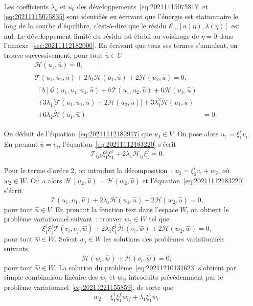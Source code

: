 \documentclass[12pt, final]{amsart}
\begin{document}
Les coefficients \(\lambda_k\) et \(u_k\) des
développements~\eqref{eq:20211115075817} et \eqref{eq:20211115075835} sont
identifiés en écrivant que l'énergie est stationnaire le long de la courbe
d'équilibre, c'est-à-dire que le résidu
\(ℰ_{,u}[u(η), \lambda(η)]\) est nul. Le développement limité du
résidu est établi au voisinage de \(η=0\) dans
l'annexe~\ref{sec:20211112182000}. En écrivant que tous ses termes s'annulent,
on trouve successivement, pour tout \(\hat{u}∈ U\)
\begin{gather}
  \label{eq:20211112182917}
  \mathcal H(u_1, \hat{u})=0,\\
  \label{eq:20211112183220}
  \mathcal T(u_1, u_1, \hat{u})
  +2\lambda_1\dot{\mathcal H}(u_1, \hat{u})
  +2\mathcal H(u_2, \hat{u})=0,\\
  \begin{aligned}[b]
    \mathcal Q(u_1, u_1, u_1, \hat{u})
    +6\mathcal T(u_1, u_2, \hat{u})+6\mathcal H(u_3, \hat{u})&\\
    +3\lambda_1\bigl[\dot{\mathcal T}(u_1, u_1, \hat{u})
    +2\dot{\mathcal H}(u_2, \hat{u})\bigr]
    +3\lambda_1^2\ddot{\mathcal H}(u_1, \hat{u})&\\
    +6\lambda_2\dot{\mathcal H}(u_1, \hat{u})&=0.
  \end{aligned}
\end{gather}

On déduit de l'équation~\eqref{eq:20211112182917} que \(u_1∈ V\). On pose
alors \(u_1=ξ_1^i v_i\). En prenant \(\hat{u}=v_i\),
l'équation~\eqref{eq:20211112183220} s'écrit
\begin{equation}
  \mathcal T_{ijk}ξ_1^jξ_1^k+2\lambda_1\dot{\mathcal H}_{ij}ξ_1^j=0.
\end{equation}

Pour le terme d'ordre 2, on introduit la décomposition~:
\(u_2=ξ_2^iv_i+w_2\), où \(w_2∈ W\). On a alors
\(\mathcal H(u_2, \hat{u})=\mathcal H(w_2, \hat{u})\) et
l'équation~\eqref{eq:20211112183220} s'écrit
\begin{equation}
  \mathcal T(u_1, u_1, \hat{u})+2\lambda_1\dot{\mathcal H}(u_1, \hat{u})
  +2\mathcal H(w_2, \hat{u})=0,
\end{equation}
pour tout \(\hat{u}∈ V\). En prenant la fonction test dans l'espace \(W\), on
obtient le problème variationnel suivant~: trouver \(w_2∈ W\) tel
que
\begin{equation}
  \label{eq:20211210131623}
  ξ_1^iξ_1^j\mathcal T(v_i, v_j, \hat{w})
  +2\lambda_1ξ_1^i\dot{\mathcal H}(v_i, \hat{w})
  +2\mathcal H(w_2, \hat{w})=0,
\end{equation}
pour tout \(\hat{w}∈ W\). Soient \(w_i∈ W\) les solutions des problèmes
variationnels suivants
\begin{equation}
  \mathcal H(w_i, \hat{w})+\dot{\mathcal H}(v_i, \hat{w})=0,
\end{equation}
pour tout \(\hat{w}∈ W\). La solution du problème~\eqref{eq:20211210131623}
s'obtient par simple combinaison linéaire des \(w_i\) et \(w_{ij}\) introduits
précédemment par le problème variationnel~\eqref{eq:20211221155859}, de sorte
que
\begin{equation}
  w_2=ξ_1^iξ_1^jw_{ij}+\lambda_1ξ_1^i w_i.
\end{equation}
\end{document}
